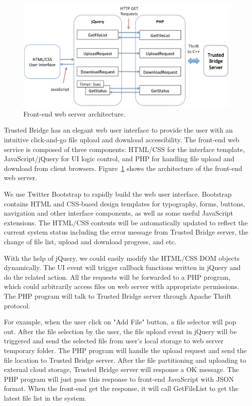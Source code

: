 
\begin{figure}[ht]
\centering
\includegraphics[width=5.2in]{pics/web_arch.png}
\caption{Front-end web server architecture.}
\label{fig:web}
\end{figure}

Trusted Bridge has an elegant web user interface to provide the user with an intuitive click-and-go file upload and download accessibility. The front-end web service is composed of three
components: HTML/CSS for the interface template, JavaScript/jQuery for UI logic control, and PHP for handling file upload and download from client browsers. Figure~\ref{fig:web} shows the architecture of the front-end web server.

We use Twitter Bootstrap to rapidly build the web user interface. Bootstrap contains HTML and CSS-based design templates for typography, forms, buttons, navigation and other interface components, as well as some useful JavaScript extensions. The HTML/CSS contents will be automatically updated to reflect the current system status including the error message from Trusted Bridge server, the change of file list, upload and download progress, and etc. 

With the help of jQuery, we could easily modify the HTML/CSS DOM objects dynamically. The UI event will trigger callback functions written in jQuery and do the related action. All the requests will be forwarded to a PHP program, which could arbitrarily access files on web server with appropriate permissions. The PHP program will talk to Trusted Bridge server through Apache Thrift protocol.

For example, when the user click on "Add File" button, a file selector will pop out. After the file selection by the user, the file upload event in jQuery will be triggered and send the selected file from user's local storage to web server temporary folder. The PHP program will handle the upload request and send the file location to Trusted Bridge server. After the file partitioning and uploading to external cloud storage, Trusted Bridge server will response a OK message. The PHP program will just pass this response to front-end JavaScript with JSON format. When the front-end get the response, it will call GetFileList to get the latest file list in the system.


